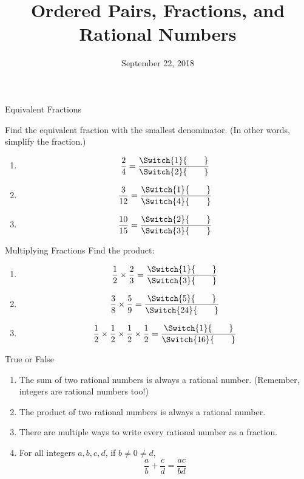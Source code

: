\documentclass[12pt,letterpaper]{article}
\title{Ordered Pairs, Fractions, and Rational Numbers}
\date{September 22, 2018}
\begin{document}
\maketitle

\thispagestyle{empty}

\newcommand{\fracans}[2]{
\frac{\Switch{#1}{\hspace{2em}}}{\Switch{#2}{\hspace{2em}}}}

\begin{problem}{Equivalent Fractions}

 Find the equivalent fraction with the smallest denominator. (In other words,
 simplify the fraction.)

 \begin{enumerate}[\hspace{.5cm}a.]
  \item \[ \frac{2}{4} = \fracans{1}{2} \]
  \item \[ \frac{3}{12} = \fracans{1}{4} \]
  \item \[ \frac{10}{15} = \fracans{2}{3} \]
 \end{enumerate}
\end{problem}

\begin{problem}{Multiplying Fractions}
Find the product:

\begin{enumerate}[\hspace{.5cm}a.]
\item \[ \frac{1}{2} \times \frac{2}{3} = \fracans{1}{3} \]
\item \[ \frac{3}{8} \times \frac{5}{9} = \fracans{5}{24} \]
\item \[ \frac{1}{2} \times \frac{1}{2} \times \frac{1}{2} \times \frac{1}{2}
= \fracans{1}{16} \]
\end{enumerate}
\end{problem}

\begin{problem}{True or False}
  \begin{enumerate}
    \item The sum of two rational numbers is always a rational number.
    (Remember, integers are rational numbers too!) \hfill \TFTrue
    \item The product of two rational numbers is always a rational number.
    \hfill \TFTrue
    \item There are multiple ways to write every rational number as a fraction.
    \hfill \TFTrue
    \item For all integers \(a, b, c, d\), if \(b \ne 0 \ne d\), \[
      \frac{a}{b} + \frac{c}{d} = \frac{ac}{bd}
    \] \hfill \TFFalse
  \end{enumerate}
\end{problem}
\end{document}
